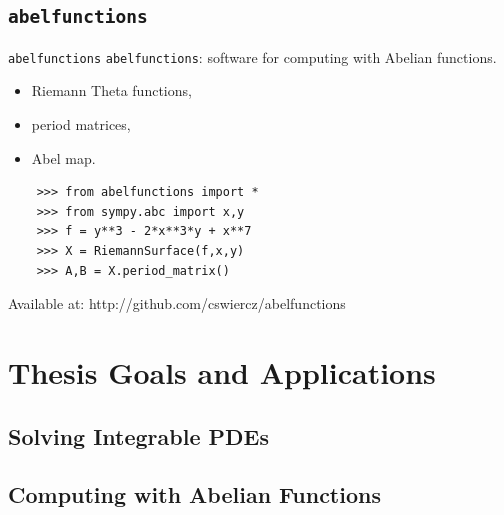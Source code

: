\documentclass {beamer}
\begin{document}
\subsection{{\tt abelfunctions}}

\begin{frame}[fragile]{{\tt abelfunctions}}{}
  {\tt abelfunctions}: software for computing with Abelian functions.
  \begin{itemize}
    \item Riemann Theta functions,
    \item period matrices,
    \item Abel map.
  \end{itemize}

  \begin{verbatim}
    >>> from abelfunctions import *
    >>> from sympy.abc import x,y
    >>> f = y**3 - 2*x**3*y + x**7
    >>> X = RiemannSurface(f,x,y)
    >>> A,B = X.period_matrix()
  \end{verbatim}

  \begin{centering}
    \small
    Available at: http://github.com/cswiercz/abelfunctions
  \end{centering}
  \begin{center}

  \end{center}
\end{frame}


\section{Thesis Goals and Applications}

\subsection{Solving Integrable PDEs}



\subsection{Computing with Abelian Functions}
\end{document}
